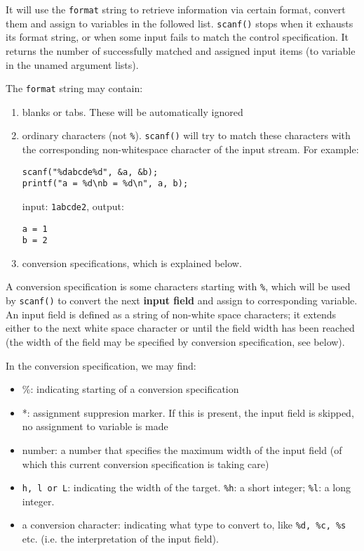 \documentclass[11pt]{article}
\begin{document}
It will use the \texttt{format} string to retrieve information via certain format, convert them and assign to variables in the followed list. \texttt{scanf()} stops when it exhausts its format string, or when some input fails to match the control specification. It returns the number of successfully matched and assigned input items (to variable in the unamed argument lists).

The \texttt{format} string may contain:
\begin{enumerate}
\item blanks or tabs. These will be automatically ignored
\item ordinary characters (not \texttt{\%}). \texttt{scanf()} will try to match these characters with the corresponding non-whitespace character of the input stream. For example:
\begin{verbatim}
scanf("%dabcde%d", &a, &b);
printf("a = %d\nb = %d\n", a, b);
\end{verbatim}
input: \texttt{1abcde2}, output:
\begin{Verbatim}[frame=single]
a = 1
b = 2
\end{Verbatim}
\item conversion specifications, which is explained below.
\end{enumerate}

A conversion specification is some characters starting with \texttt{\%}, which will be used by \texttt{scanf()} to convert the next \textbf{input field} and assign to corresponding variable. An input field is defined as a string of non-white space characters; it extends either to the next white space character or until the field width has been reached (the width of the field may be specified by conversion specification, see below).

In the conversion specification, we may find:
\begin{itemize}
\item \%: indicating starting of a conversion specification
\item *: assignment suppresion marker. If this is present, the input field is skipped, no assignment to variable is made
\item number: a number that specifies the maximum width of the input field (of which this current conversion specification is taking care)
\item \texttt{h, l or L}: indicating the width of the target. \texttt{\%h}: a short integer; \texttt{\%l}: a long integer.
\item a conversion character: indicating what type to convert to, like \texttt{\%d, \%c, \%s} etc. (i.e. the interpretation of the input field).
\end{itemize}
\end{document}
